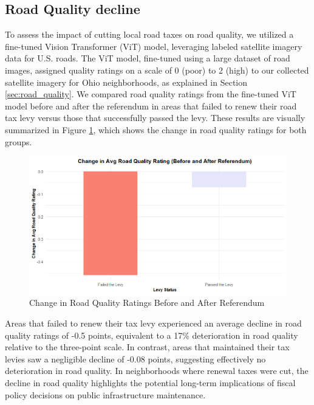 



\subsection{Road Quality decline} \label{sec:road_quality_decline}

 To assess the impact of cutting local road taxes on road quality, we utilized a fine-tuned Vision Transformer (ViT) model, leveraging labeled satellite imagery data for U.S. roads. The ViT model, fine-tuned using a large dataset of road images, assigned quality ratings on a scale of 0 (poor) to 2 (high) to our collected satellite imagery for Ohio neighborhoods, as explained in Section \ref{sec:road_quality}. We compared road quality ratings from the fine-tuned ViT model before and after the referendum in areas that failed to renew their road tax levy versus those that successfully passed the levy. These results are visually summarized in Figure \ref{fig:road_quality_change}, which shows the change in road quality ratings for both groups. 


\begin{figure}[htbp]
    \centering
    \includegraphics[width=\textwidth,keepaspectratio]{images/road_quality_change.png}
    \caption{Change in Road Quality Ratings Before and After Referendum}
    \label{fig:road_quality_change}
\end{figure}

Areas that failed to renew their tax levy experienced an average decline in road quality ratings of -0.5 points, equivalent to a 17\% deterioration in road quality relative to the three-point scale. In contrast, areas that maintained their tax levies saw a negligible decline of -0.08 points, suggesting effectively no deterioration in road quality. In neighborhoods where renewal taxes were cut, the decline in road quality highlights the potential long-term implications of fiscal policy decisions on public infrastructure maintenance.


